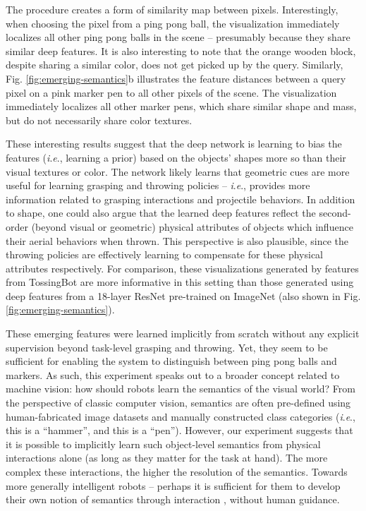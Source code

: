 \documentclass[journal]{IEEEtran}
\newcommand{\ie}{\textit{i}.\textit{e}., }
\begin{document}
The procedure creates a form of similarity map between pixels. Interestingly, when choosing the pixel from a ping pong ball, the visualization immediately localizes all other ping pong balls in the scene -- presumably because they share similar deep features. It is also interesting to note that the orange wooden block, despite sharing a similar color, does not get picked up by the query. Similarly, Fig. \ref{fig:emerging-semantics}b illustrates the feature distances between a query pixel on a pink marker pen to all other pixels of the scene. The visualization immediately localizes all other marker pens, which share similar shape and mass, but do not necessarily share color textures.

These interesting results suggest that the deep network is learning to bias the features (\ie learning a prior) based on the objects' shapes more so than their visual textures or color. The network likely learns that geometric cues are more useful for learning grasping and throwing policies -- \ie provides more information related to grasping interactions and projectile behaviors. In addition to shape, one could also argue that the learned deep features reflect the second-order (beyond visual or geometric) physical attributes of objects which influence their aerial behaviors when thrown. This perspective is also plausible, since the throwing policies are effectively learning to compensate for these physical attributes respectively. For comparison, these visualizations generated by features from TossingBot are more informative in this setting than those generated using deep features from a 18-layer ResNet pre-trained on ImageNet (also shown in Fig. \ref{fig:emerging-semantics}).

These emerging features were learned implicitly from scratch without any explicit supervision beyond task-level grasping and throwing. Yet, they seem to be sufficient for enabling the system to distinguish between ping pong balls and markers. As such, this experiment speaks out to a broader concept related to machine vision: how should robots learn the semantics of the visual world? From the perspective of classic computer vision, semantics are often pre-defined using human-fabricated image datasets and manually constructed class categories (\ie this is a ``hammer'', and this is a ``pen''). However, our experiment suggests that it is possible to implicitly learn such object-level semantics from physical interactions alone (as long as they matter for the task at hand). The more complex these interactions, the higher the resolution of the semantics. Towards more generally intelligent robots -- perhaps it is sufficient for them to develop their own notion of semantics through interaction \cite{xu2019densephysnet}, without human guidance.%
\end{document}
